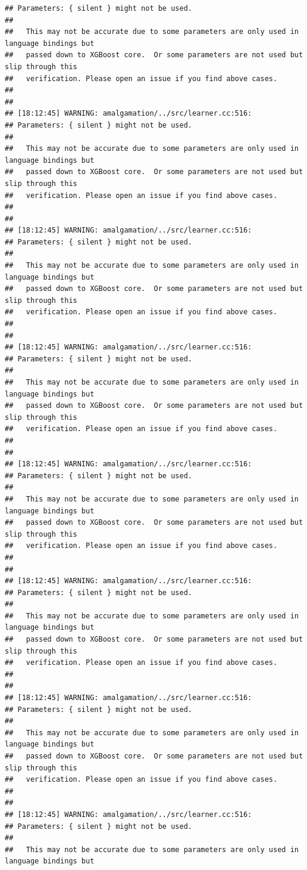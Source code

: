 \documentclass[AMS,STIX2COL]{WileyNJD-v2}\usepackage[]{graphicx}\usepackage[]{color}
\makeatletter
\newenvironment{kframe}{%
 \def\at@end@of@kframe{}%
 \ifinner\ifhmode%
  \def\at@end@of@kframe{\end{minipage}}%
  \begin{minipage}{\columnwidth}%
 \fi\fi%
 \def\FrameCommand##1{\hskip\@totalleftmargin \hskip-\fboxsep
 \colorbox{shadecolor}{##1}\hskip-\fboxsep
     \hskip-\linewidth \hskip-\@totalleftmargin \hskip\columnwidth}%
 \MakeFramed {\advance\hsize-\width
   \@totalleftmargin\z@ \linewidth\hsize
   \@setminipage}}%
 {\par\unskip\endMakeFramed%
 \at@end@of@kframe}
\newenvironment{knitrout}{}{} %
\makeatother
\begin{document}
\begin{knitrout}
\begin{kframe}
\begin{verbatim}
## Parameters: { silent } might not be used.
## 
##   This may not be accurate due to some parameters are only used in language bindings but
##   passed down to XGBoost core.  Or some parameters are not used but slip through this
##   verification. Please open an issue if you find above cases.
## 
## 
## [18:12:45] WARNING: amalgamation/../src/learner.cc:516: 
## Parameters: { silent } might not be used.
## 
##   This may not be accurate due to some parameters are only used in language bindings but
##   passed down to XGBoost core.  Or some parameters are not used but slip through this
##   verification. Please open an issue if you find above cases.
## 
## 
## [18:12:45] WARNING: amalgamation/../src/learner.cc:516: 
## Parameters: { silent } might not be used.
## 
##   This may not be accurate due to some parameters are only used in language bindings but
##   passed down to XGBoost core.  Or some parameters are not used but slip through this
##   verification. Please open an issue if you find above cases.
## 
## 
## [18:12:45] WARNING: amalgamation/../src/learner.cc:516: 
## Parameters: { silent } might not be used.
## 
##   This may not be accurate due to some parameters are only used in language bindings but
##   passed down to XGBoost core.  Or some parameters are not used but slip through this
##   verification. Please open an issue if you find above cases.
## 
## 
## [18:12:45] WARNING: amalgamation/../src/learner.cc:516: 
## Parameters: { silent } might not be used.
## 
##   This may not be accurate due to some parameters are only used in language bindings but
##   passed down to XGBoost core.  Or some parameters are not used but slip through this
##   verification. Please open an issue if you find above cases.
## 
## 
## [18:12:45] WARNING: amalgamation/../src/learner.cc:516: 
## Parameters: { silent } might not be used.
## 
##   This may not be accurate due to some parameters are only used in language bindings but
##   passed down to XGBoost core.  Or some parameters are not used but slip through this
##   verification. Please open an issue if you find above cases.
## 
## 
## [18:12:45] WARNING: amalgamation/../src/learner.cc:516: 
## Parameters: { silent } might not be used.
## 
##   This may not be accurate due to some parameters are only used in language bindings but
##   passed down to XGBoost core.  Or some parameters are not used but slip through this
##   verification. Please open an issue if you find above cases.
## 
## 
## [18:12:45] WARNING: amalgamation/../src/learner.cc:516: 
## Parameters: { silent } might not be used.
## 
##   This may not be accurate due to some parameters are only used in language bindings but

\end{verbatim}
\end{kframe}
\end{knitrout}
\end{document}
